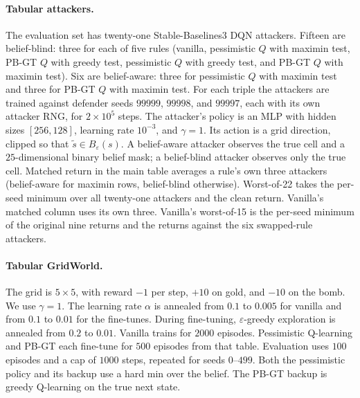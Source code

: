 \documentclass[10pt,twocolumn]{article}
\begin{document}
\paragraph{Tabular attackers.}
The evaluation set has twenty-one Stable-Baselines3 DQN attackers.
Fifteen are belief-blind: three for each of five rules (vanilla, pessimistic $Q$ with maximin test, PB-GT $Q$ with greedy test, pessimistic $Q$ with greedy test, and PB-GT $Q$ with maximin test).
Six are belief-aware: three for pessimistic $Q$ with maximin test and three for PB-GT $Q$ with maximin test.
For each triple the attackers are trained against defender seeds $99999$, $99998$, and $99997$, each with its own attacker RNG, for $2{\times}10^5$ steps.
The attacker's policy is an MLP with hidden sizes $[256,128]$, learning rate $10^{-3}$, and $\gamma{=}1$.
Its action is a grid direction, clipped so that $\tilde s\in B_\varepsilon(s)$.
A belief-aware attacker observes the true cell and a $25$-dimensional binary belief mask; a belief-blind attacker observes only the true cell.
Matched return in the main table averages a rule's own three attackers (belief-aware for maximin rows, belief-blind otherwise).
Worst-of-22 takes the per-seed minimum over all twenty-one attackers and the clean return.
Vanilla's matched column uses its own three.
Vanilla's worst-of-15 is the per-seed minimum of the original nine returns and the returns against the six swapped-rule attackers.

\paragraph{Tabular GridWorld.}
The grid is $5{\times}5$, with reward $-1$ per step, $+10$ on gold, and $-10$ on the bomb.
We use $\gamma{=}1$.
The learning rate $\alpha$ is annealed from $0.1$ to $0.005$ for vanilla and from $0.1$ to $0.01$ for the fine-tunes.
During fine-tuning, $\varepsilon$-greedy exploration is annealed from $0.2$ to $0.01$.
Vanilla trains for $2000$ episodes.
Pessimistic Q-learning and PB-GT each fine-tune for $500$ episodes from that table.
Evaluation uses $100$ episodes and a cap of $1000$ steps, repeated for seeds $0$--$499$.
Both the pessimistic policy and its backup use a hard min over the belief.
The PB-GT backup is greedy Q-learning on the true next state.
\end{document}
